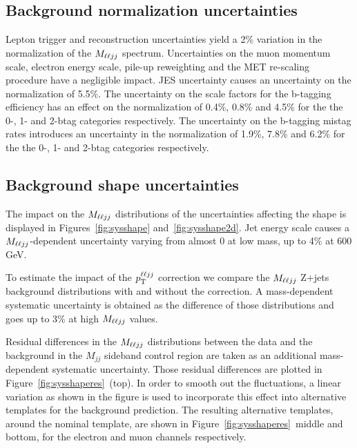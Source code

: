 \subsection{Background normalization uncertainties}

Lepton trigger and reconstruction uncertainties yield a 2\% variation in the
normalization of the $M_{\ell\ell jj}$ spectrum. Uncertainties on the muon momentum scale,
electron energy scale, pile-up reweighting and the MET re-scaling procedure have a negligible impact. JES uncertainty 
causes an uncertainty on the normalization of 5.5\%. The uncertainty on the scale factors for the b-tagging efficiency has an effect on the normalization of 0.4\%, 0.8\% and 4.5\% for the the 0-, 1- and 2-btag categories respectively. The uncertainty on the b-tagging mistag rates introduces an uncertainty in the normalization of 1.9\%, 7.8\% and 6.2\% for the the 0-, 1- and 2-btag categories respectively.






\subsection{Background shape uncertainties}

The impact on the $M_{\ell\ell jj}$ distributions of the uncertainties affecting the shape is displayed in Figures~\ref{fig:sysshape} and~\ref{fig:sysshape2d}. Jet energy scale causes a $M_{\ell\ell jj}$-dependent uncertainty varying from almost 0 at low mass, up to 4\% at 600 GeV.

To estimate the impact of the $p_{\mathrm{T}}^{\ell\ell jj}$ correction we compare the $M_{\ell\ell jj}$ Z+jets background distributions with and without the correction. A mass-dependent systematic uncertainty is obtained as the difference of those distributions and goes up to 3\% at high $M_{\ell\ell jj}$ values.

Residual differences in the $M_{\ell\ell jj}$ distributions between the data and the background in the $M_{jj}$ sideband control region are taken as an additional mass-dependent systematic uncertainty. Those residual differences are plotted in Figure~\ref{fig:sysshaperes}~(top). In order to smooth out the fluctuations, a linear variation as shown in the figure is used to incorporate this effect into alternative templates for the background prediction. The resulting alternative templates, around the nominal template, are shown in Figure~\ref{fig:sysshaperes}~middle and bottom, for the electron and muon channels respectively. 



